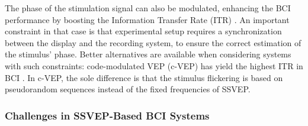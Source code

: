 The phase of the stimulation signal can also be modulated, enhancing the BCI performance by boosting the Information Transfer Rate (ITR) \citep{pan_enhancing_2011, nakanishi_high-speed_2014}. %
An important constraint in that case is that experimental setup requires a synchronization between the display and the recording system, to ensure the correct estimation of the stimulus' phase.
Better alternatives are available when considering systems with such constraints: code-modulated VEP (c-VEP) has yield the highest ITR in BCI \citep{spuler_one_2012, bin_high-speed_2011}.
In c-VEP, the sole difference is that the stimulus flickering is based on pseudorandom sequences instead of the fixed frequencies of SSVEP.



\subsubsection{Challenges in SSVEP-Based BCI Systems}

